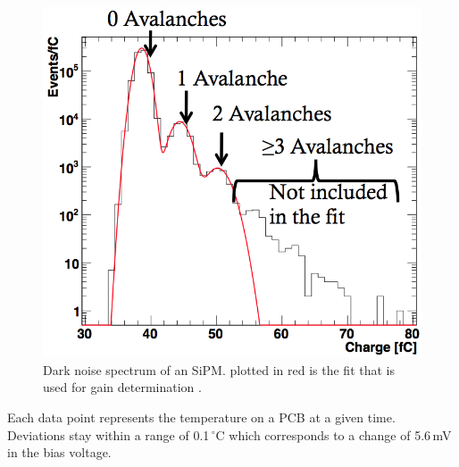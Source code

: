 \begin{figure}[h]
\begin{minipage}[t]{0.455\textwidth}
\includegraphics[width=\textwidth]{Figures/kuensken/gainDetermination.png}
\caption{Dark noise spectrum of an SiPM. plotted in red is the fit that is used for gain determination \cite{kuenskenCalor}.}
\label{kuenskendarkNoise}
\end{minipage}
\end{figure}
Each data point represents the temperature on a PCB at a given time. Deviations stay within a range of 0.1\,$^\circ$C which corresponds to a change of 5.6\,mV in the bias voltage.

